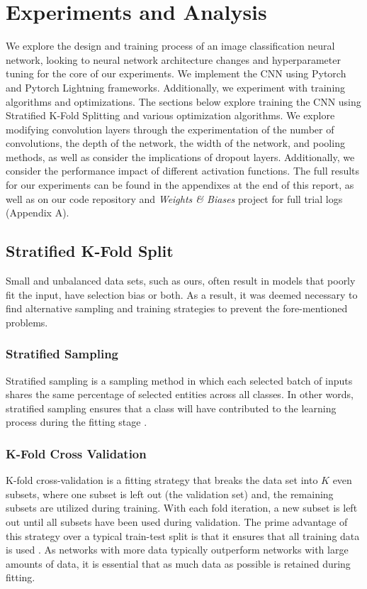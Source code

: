 \documentclass{article}
\begin{document}
\section{Experiments and Analysis}
 We explore the design and training process of an image classification neural network, looking to neural network architecture changes and hyperparameter tuning for the core of our experiments. We implement the CNN using Pytorch \cite{NEURIPS2019_9015} and Pytorch Lightning \cite{pytorch-lightning} frameworks. Additionally, we experiment with training algorithms and optimizations. The sections below explore training the CNN using Stratified K-Fold Splitting and various optimization algorithms. We explore modifying convolution layers through the experimentation of the number of convolutions, the depth of the network, the width of the network, and pooling methods, as well as consider the implications of dropout layers. Additionally, we consider the performance impact of different activation functions. The full results for our experiments can be found in the appendixes at the end of this report, as well as on our code repository and \emph{Weights \& Biases} \cite{wandb} project for full trial logs (Appendix A). 

\subsection{Stratified K-Fold Split}
Small and unbalanced data sets, such as ours, often result in models that poorly fit the input, have selection bias or both. As a result, it was deemed necessary to find alternative sampling and training strategies to prevent the fore-mentioned problems.

\subsubsection{Stratified Sampling}
Stratified sampling is a sampling method in which each selected batch of inputs shares the same percentage of selected entities across all classes. In other words, stratified sampling ensures that a class will have contributed to the learning process during the fitting stage \cite{scikit-learn}.

\subsubsection{K-Fold Cross Validation}
K-fold cross-validation is a fitting strategy that breaks the data set into $K$ even subsets, where one subset is left out (the validation set) and, the remaining subsets are utilized during training. With each fold iteration, a new subset is left out until all subsets have been used during validation. The prime advantage of this strategy over a typical train-test split is that it ensures that all training data is used \cite{scikit-learn}. As networks with more data typically outperform networks with large amounts of data, it is essential that as much data as possible is retained during fitting.
\end{document}
